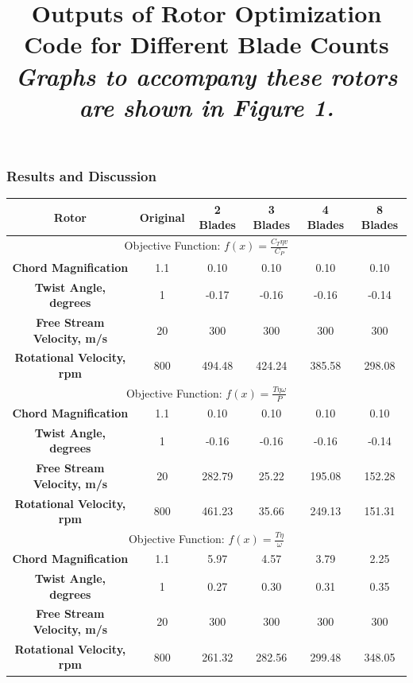\documentclass{article}
\begin{document}
\subsubsection*{Results and Discussion}

\begin{table}[bp]
	\centering
	\title{Outputs of Rotor Optimization Code for Different Blade Counts \newline}
	\title{\emph{Graphs to accompany these rotors are shown in Figure 1.}} \label{table:1} \newline
	\begin{tabular}{| c | c | c | c | c | c |}
		 \hline
		 \textbf{Rotor} & Original & 2 Blades & 3 Blades & 4 Blades & 8 Blades \\ \hline
		 \multicolumn{6}{c|}{Objective Function: $ f(x) = \frac{C_{T} \eta v}{C_{P}} $} \\ \hline
		 \textbf{Chord Magnification} & 1.1 & 0.10 & 0.10 & 0.10 & 0.10 \\ \newline
		 \textbf{Twist Angle, degrees} & 1 & -0.17 & -0.16 & -0.16 & -0.14 \\ \newline
		 \textbf{Free Stream Velocity, m/s} & 20 & 300 & 300 & 300 & 300 \\ \newline
		 \textbf{Rotational Velocity, rpm} & 800 & 494.48 & 424.24 & 385.58 & 298.08 \\ \hline
		 \multicolumn{6}{c|}{Objective Function: $ f(x) = \frac{T \eta \omega}{P}  $} \\ \hline
		 \textbf{Chord Magnification} & 1.1 & 0.10 & 0.10 & 0.10 & 0.10 \\ \newline
		 \textbf{Twist Angle, degrees} & 1 & -0.16 & -0.16 & -0.16 & -0.14 \\ \newline
		 \textbf{Free Stream Velocity, m/s} & 20 & 282.79 & 25.22 & 195.08 & 152.28 \\ \newline
		 \textbf{Rotational Velocity, rpm} & 800 & 461.23 & 35.66 & 249.13 & 151.31 \\ \hline
		 \multicolumn{6}{c|}{Objective Function: $ f(x) = \frac{T \eta}{\omega} $} \\ \hline
		 \textbf{Chord Magnification} & 1.1 & 5.97 & 4.57 & 3.79 & 2.25 \\ \newline
		 \textbf{Twist Angle, degrees} & 1 & 0.27 & 0.30 & 0.31 & 0.35 \\ \newline
		 \textbf{Free Stream Velocity, m/s} & 20 & 300 & 300 & 300 & 300 \\ \newline
		 \textbf{Rotational Velocity, rpm} & 800 & 261.32 & 282.56 & 299.48 & 348.05 \\ \hline
	\end{tabular}
\end{table}
\end{document}
